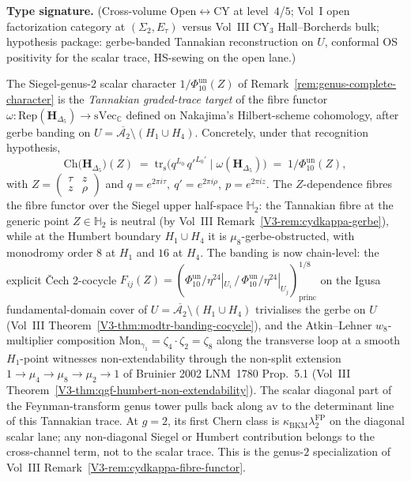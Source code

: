 \begin{remark}
\label{rem:genus-complete-tannakian}
\textbf{Type signature.} (Cross-volume Open$\leftrightarrow$CY at
level~$4$/$5$; Vol~I open factorization category at $(\Sigma_2,
E_\tau)$ versus Vol~III CY$_3$ Hall--Borcherds bulk; hypothesis
package: gerbe-banded Tannakian reconstruction on $U$, conformal OS
positivity for the scalar trace, HS-sewing on the open lane.)

The Siegel-genus-$2$ scalar character $1/\Phi_{10}^{\mathrm{un}}(Z)$ of
Remark~\ref{rem:genus-complete-character} is the
\emph{Tannakian graded-trace target} of the fibre functor
$\omega\colon \mathrm{Rep}(\mathbf H_{\Delta_5}) \to
\mathrm{sVec}_{\mathbb C}$ defined on Nakajima's Hilbert-scheme
cohomology, after gerbe banding on
$U=\overline{\mathcal A_2}\setminus(H_1\cup H_4)$. Concretely, under
that recognition hypothesis,
\[
 \mathrm{Ch}\bigl(\mathbf H_{\Delta_5}\bigr)(Z)
 \;=\;
 \mathrm{tr}_{\mathrm{s}}\!\bigl(q^{L_0}\,q'^{L_0'}\mid \omega(\mathbf H_{\Delta_5})\bigr)
 \;=\;
 1/\Phi_{10}^{\mathrm{un}}(Z),
\]
with $Z = \left(\begin{smallmatrix}\tau & z\\ z & \rho\end{smallmatrix}\right)$
and $q = e^{2\pi i\tau},\ q' = e^{2\pi i\rho},\ p = e^{2\pi i z}$. The
$Z$-dependence fibres the fibre functor over the Siegel upper
half-space $\mathbb H_2$: the Tannakian fibre at the generic point
$Z\in \mathbb H_2$ is neutral (by
Vol~III Remark~\ref{V3-rem:cydkappa-gerbe}), while at the Humbert
boundary $H_1 \cup H_4$ it is $\mu_8$-gerbe-obstructed, with
monodromy order $8$ at $H_1$ and $16$ at $H_4$.
The banding is now chain-level: the explicit \v{C}ech 2-cocycle
$F_{ij}(Z)=(\Phi_{10}^{\mathrm{un}}/\eta^{24}|_{U_i}\,/\,\Phi_{10}^{\mathrm{un}}/\eta^{24}|_{U_j})^{1/8}_{\mathrm{princ}}$
on the Igusa fundamental-domain cover of $U=\overline{\mathcal A_2}\setminus(H_1\cup H_4)$
trivialises the gerbe on $U$ (Vol~III
Theorem~\ref{V3-thm:modtr-banding-cocycle}), and the
Atkin--Lehner $w_8$-multiplier composition
$\mathrm{Mon}_{\gamma_1}=\zeta_4\cdot\zeta_2=\zeta_8$ along the
transverse loop at a smooth $H_1$-point witnesses non-extendability
through the non-split extension $1\to\mu_4\to\mu_8\to\mu_2\to 1$
of Bruinier 2002 LNM~1780 Prop.~5.1 (Vol~III
Theorem~\ref{V3-thm:qgf-humbert-non-extendability}).
The scalar diagonal part of the Feynman-transform genus tower pulls
back along $\mathrm{av}$ to the determinant line of this Tannakian
trace. At $g=2$, its first Chern class is
$\kappa_{\mathrm{BKM}}\lambda_2^{\mathrm{FP}}$ on the diagonal
scalar lane; any non-diagonal Siegel or Humbert contribution belongs
to the cross-channel term, not to the scalar trace. This is the
genus-$2$ specialization of Vol~III
Remark~\ref{V3-rem:cydkappa-fibre-functor}.
\end{remark}

